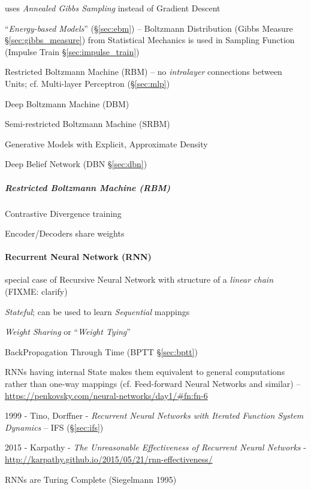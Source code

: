 uses \emph{Annealed Gibbs Sampling} instead of Gradient Descent

``\emph{Energy-based Models}'' (\S\ref{sec:ebm}) -- Boltzmann Distribution
(Gibbs Measure \S\ref{sec:gibbs_measure}) from Statistical Mechanics is used in
Sampling Function (Impulse Train \S\ref{sec:impulse_train})

Restricted Boltzmann Machine (RBM) -- no \emph{intralayer} connections between
Units; cf. Multi-layer Perceptron (\S\ref{sec:mlp})

Deep Boltzmann Machine (DBM)

Semi-restricted Boltzmann Machine (SRBM)

Generative Models with Explicit, Approximate Density

Deep Belief Network (DBN \S\ref{sec:dbn})



\subparagraph{Restricted Boltzmann Machine (RBM)}\label{sec:rbm}\hfill

Contrastive Divergence training

Encoder/Decoders share weights



\paragraph{Recurrent Neural Network (RNN)}\label{sec:rnn}\hfill

special case of Recursive Neural Network with structure of a \emph{linear chain}
(FIXME: clarify)

\emph{Stateful}; can be used to learn \emph{Sequential} mappings

\emph{Weight Sharing} or ``\emph{Weight Tying}''

BackPropagation Through Time (BPTT \S\ref{sec:bptt})

RNNs having internal State makes them equivalent to general computations rather
than one-way mappings (cf. Feed-forward Neural Networks and similar)
--\url{https://penkovsky.com/neural-networks/day1/#fn:fn-6}

1999 - Tino, Dorffner - \emph{Recurrent Neural Networks with Iterated Function
  System Dynamics} -- IFS (\S\ref{sec:ifs})

\asterism

2015 - Karpathy - \emph{The Unreasonable Effectiveness of Recurrent Neural
  Networks} -
\url{http://karpathy.github.io/2015/05/21/rnn-effectiveness/}

RNNs are Turing Complete (Siegelmann 1995)

